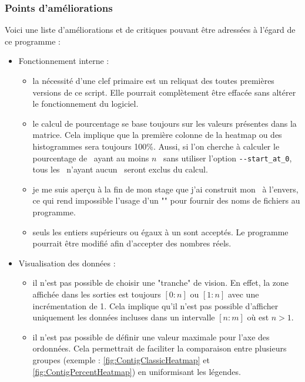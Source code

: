 \documentclass[../main]{subfiles} %
\begin{document}
\subsubsection{Points d'améliorations}
Voici une liste d'améliorations et de critiques pouvant être adressées à l'égard de ce programme :

\begin{itemize}
    \item Fonctionnement interne :
        \begin{itemize}
            \item la nécessité d'une clef primaire est un reliquat des toutes premières versions de ce script. Elle pourrait complètement être effacée sans altérer le fonctionnement du logiciel.   

            \item le calcul de pourcentage se base toujours sur les valeurs présentes dans la matrice. Cela implique que la première colonne de la heatmap ou des histogrammes sera toujours 100\%. Aussi, si l'on cherche à calculer le pourcentage de \contigs ayant au moins $n$ \SNP sans utiliser l'option  \lstinline{--start_at_0}, tous les \contigs n'ayant aucun \SNP seront exclus du calcul.
   
            \item je me suis aperçu à la fin de mon stage que j'ai construit mon \getopts à l'envers, ce qui rend impossible l'usage d'un "\pipe" pour fournir des noms de fichiers au programme.

            \item seuls les entiers supérieurs ou égaux à un sont acceptés. Le programme pourrait être modifié afin d'accepter des nombres réels.
    
        \end{itemize}

    \item Visualisation des données :
        \begin{itemize}
            \item il n'est pas possible de choisir une "tranche" de vision. En effet, la zone affichée dans les sorties est toujours $[0:n]$ ou $[1:n]$ avec une incrémentation de 1. Cela implique qu'il n'est pas possible d'afficher uniquement les données incluses dans un intervalle $[n:m]$ où est $n>1$.
            
            \item il n'est pas possible de définir une valeur maximale pour l'axe des ordonnées. Cela permettrait de faciliter la comparaison entre plusieurs groupes (exemple : \cref{fig:ContigClassicHeatmap} et \cref{fig:ContigPercentHeatmap}) en uniformisant les légendes.  


\end{itemize}
\end{itemize}
\end{document}
